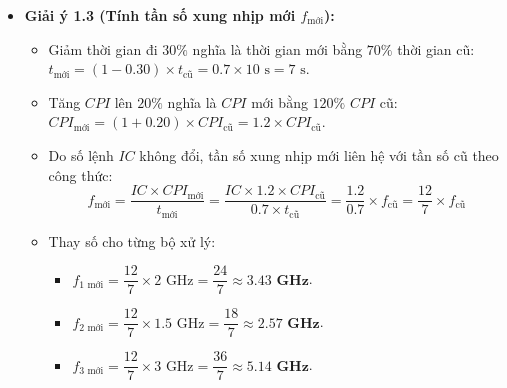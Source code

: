 \begin{itemize}
    \item \textbf{Giải ý 1.3 (Tính tần số xung nhịp mới $f_{\text{mới}}$):}
    \begin{itemize}
        \item Giảm thời gian đi $30\%$ nghĩa là thời gian mới bằng $70\%$ thời gian cũ: $t_{\text{mới}} = (1 - 0.30) \times t_{\text{cũ}} = 0.7 \times 10\text{ s} = 7\text{ s}$.
        \item Tăng $CPI$ lên $20\%$ nghĩa là $CPI$ mới bằng $120\%$ $CPI$ cũ: $CPI_{\text{mới}} = (1 + 0.20) \times CPI_{\text{cũ}} = 1.2 \times CPI_{\text{cũ}}$.
        \item Do số lệnh $IC$ không đổi, tần số xung nhịp mới liên hệ với tần số cũ theo công thức:
        $$f_{\text{mới}} = \frac{IC \times CPI_{\text{mới}}}{t_{\text{mới}}} = \frac{IC \times 1.2 \times CPI_{\text{cũ}}}{0.7 \times t_{\text{cũ}}} = \frac{1.2}{0.7} \times f_{\text{cũ}} = \frac{12}{7} \times f_{\text{cũ}}$$
        \item Thay số cho từng bộ xử lý:
        \begin{itemize}
            \item $f_{1\text{ mới}} = \dfrac{12}{7} \times 2\text{ GHz} = \dfrac{24}{7} \approx \mathbf{3.43\text{ GHz}}$.
            \item $f_{2\text{ mới}} = \dfrac{12}{7} \times 1.5\text{ GHz} = \dfrac{18}{7} \approx \mathbf{2.57\text{ GHz}}$.
            \item $f_{3\text{ mới}} = \dfrac{12}{7} \times 3\text{ GHz} = \dfrac{36}{7} \approx \mathbf{5.14\text{ GHz}}$.
        \end{itemize}
    \end{itemize}
\end{itemize}